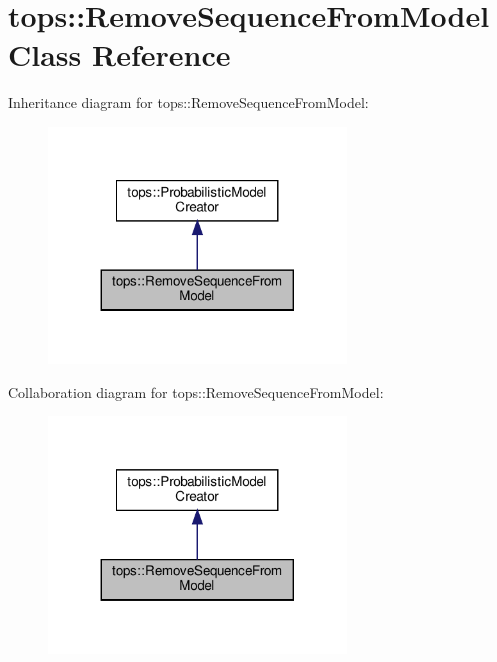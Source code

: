 \hypertarget{classtops_1_1RemoveSequenceFromModel}{}\section{tops\+:\+:Remove\+Sequence\+From\+Model Class Reference}
\label{classtops_1_1RemoveSequenceFromModel}


Inheritance diagram for tops\+:\+:Remove\+Sequence\+From\+Model\+:
\nopagebreak
\begin{figure}[H]
\begin{center}
\leavevmode
\includegraphics[width=224pt]{classtops_1_1RemoveSequenceFromModel__inherit__graph}
\end{center}
\end{figure}


Collaboration diagram for tops\+:\+:Remove\+Sequence\+From\+Model\+:
\nopagebreak
\begin{figure}[H]
\begin{center}
\leavevmode
\includegraphics[width=224pt]{classtops_1_1RemoveSequenceFromModel__coll__graph}
\end{center}
\end{figure}
